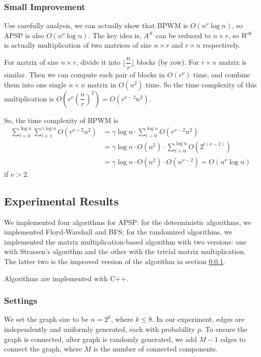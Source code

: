 \documentclass[12pt]{article}
\begin{document}
\subsubsection{Small Improvement}
\label{imp}

Use carefully analysis, we can actually show that BPWM is $O(n^\nu \log n)$, so APSP is also $O(n^\nu \log n)$. The key idea is, $A^\#$ can be reduced to $n\times r$, so $W^\#$ is actually multiplication of two matrices of size $n\times r$ and $r\times n$ respectively.

For matrix of size $n\times r$, divide it into $\lfloor\dfrac{n}{r}\rfloor$ blocks (by row). For $r\times n$ matrix is similar. Then we can compute each pair of blocks in $O(r^{\nu})$ time, and combine them into one single $n\times n$ matrix in $O(n^2)$ time. So the time complexity of this multiplication is $O(r^\nu(\dfrac{n}{r})^2)=O(r^{\nu-2}n^2)$.

So, the time complexity of BPWM is
\begin{align*}
\sum\limits_{t=0}^{\log n}\sum\limits_{l=1}^{\gamma\log n} O(r^{\nu-2}n^2) &= \gamma\log n\cdot \sum\limits_{t=0}^{\log n} O(r^{\nu-2}n^2)\\
&= \gamma\log n\cdot O(n^2)\cdot \sum\limits_{t=0}^{\log n} O(2^{t(\nu-2)})\\
&= \gamma\log n\cdot O(n^2)\cdot O(n^{\nu-2}) = O(n^\nu\log n)
\end{align*}
if $\nu>2$.

\subsection{Experimental Results}

We implemented four algorithms for APSP: for the deterministic algorithms, we implemented Floyd-Warshall and BFS; for the randomized algorithms, we implemented the matrix multiplication-based algorithm with two versions: one with Strassen's algorithm and the other with the trivial matrix multiplication. The latter two is the improved version of the algorithm in section \ref{imp}.

Algorithms are implemented with C++.

\subsubsection{Settings}

We set the graph size to be $n=2^k$, where $k\le 8$. In our experiment, edges are independently and uniformly generated, each with probability $p$. To ensure the graph is connected, after graph is randomly generated, we add $M-1$ edges to connect the graph, where $M$ is the number of connected components.
\end{document}
